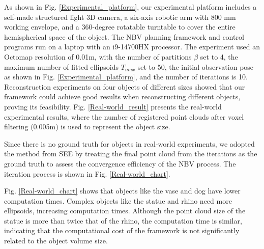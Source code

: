 As shown in Fig. \ref{Experimental_platform}, our experimental platform includes a self-made structured light 3D camera, a six-axis robotic arm with 800 mm working envelope, and a 360-degree rotatable turntable to cover the entire hemispherical space of the object. 
The NBV planning framework and control programs run on a laptop with an i9-14700HX processor. 
The experiment used an Octomap resolution of 0.01m, with the number of partitions $\beta$ set to 4, the maximum number of fitted ellipsoids $T_{max}$ set to 50, the initial observation pose as shown in Fig. \ref{Experimental_platform}, and the number of iterations is 10.
Reconstruction experiments on four objects of different sizes showed that our framework could achieve good results when reconstructing different objects, proving its feasibility.
Fig. \ref{Real-world_result} presents the real-world experimental results, where the number of registered point clouds after voxel filtering (0.005m) is used to represent the object size.

Since there is no ground truth for objects in real-world experiments, we adopted the method from SEE\cite{border2024surface} by treating the final point cloud from the iterations as the ground truth to assess the convergence efficiency of the NBV process.
The iteration process is shown in Fig. \ref{Real-world_chart}.

Fig. \ref{Real-world_chart} shows that objects like the vase and dog have lower computation times. Complex objects like the statue and rhino need more ellipsoids, increasing computation times.
Although the point cloud size of the statue is more than twice that of the rhino, the computation time is similar, indicating that the computational cost of the framework is not significantly related to the object volume size.